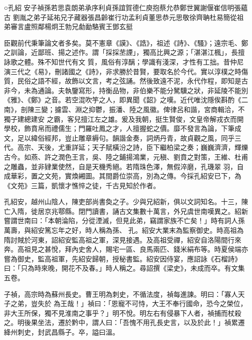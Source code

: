 
\begin{pinyinscope}

 ○孔紹
 安子禎孫若思袁朗弟承序利貞孫誼賀德仁庾抱蔡允恭鄭世翼謝偃崔信明張蘊古
 劉胤之弟子延祐兄子藏器張昌齡崔行功孟利貞董思恭元思敬徐齊聃杜易簡從祖弟審言盧照鄰楊炯王勃兄勮勔駱賓王鄧玄挺



 臣觀前代秉筆論文者多矣。莫不憲章《謨》、《誥》，祖述《詩》、《騷》；遠宗毛、鄭之訓論，近鄙班、揚之述作。謂「採採苤諲」，獨高比興之源；「湛湛江楓」，長擅詠歌之體。殊不知世代有文
 質，風俗有淳醨；學識有淺深，才性有工拙。昔仲尼演三代之《易》，刪諸國之《詩》，非求勝於昔賢，要取名於今代。實以淳樸之時傷質，民俗之語不經，故飾以文言，考之弦誦。然後致遠不泥，永代作程，即知是古非今，未為通論。夫執鑒寫形，持衡品物，非伯樂不能分駑驥之狀，非延陵不能別《雅》、《鄭》之音。若空混吹竽之人，即異聞《韶》之嘆。近代唯沈隱俟斟酌《二南》，剖陳三變；攄雲、淵之抑鬱，振潘、陸之風徽。俾律呂和諧，宮商輯洽，不獨子建總建安
 之霸，客兒擅江左之雄。爰及我朝，挺生賢俊，文皇帝解戎衣而開學校，飾賁帛而禮儒生；門羅吐鳳之才，人擅握蛇之價。靡不發言為論，下筆成文，足以緯俗經邦，豈止雕章縟句。韻諧金奏，詞炳丹青，故貞觀之風，同乎三代。高宗、天後，尤重詳延；天子賦橫汾之詩，臣下繼柏梁之奏；巍巍濟濟，輝爍古今。如燕、許之潤色王言，吳、陸之鋪揚鴻業，元稹、劉賁之對策，王維、杜甫之雕蟲，並非肄業使然，自是天機秀絕。若隋珠色澤，無假淬磨，孔璣翠
 羽，自成華彩，置之文苑，實煥緗圖。其間爵位崇高，別為之傳。今採孔紹安已下，為《文苑》三篇，凱懷才憔悴之徒，千古見知於作者。



 孔紹安，越州山陰人，陳吏部尚書奐之子。少與兄紹新，俱以文詞知名。十三，陳亡入隋，徙居京兆鄠縣。閉門讀書，誦古文集數十萬言，外兄虞世南嘆異之。紹新嘗謂世南曰：「本朝淪陷，分從湮滅，但見此弟，竊謂家族不亡矣！」時有詞人孫萬壽，與紹安篤忘年之好，時人稱為孫、
 孔。紹安大業末為監察御史。時高祖為隋討賊於河東，詔紹安監高祖之軍，深見接遇。及高祖受禪，紹安自洛陽間行來奔。高祖見之甚悅，拜內史舍人，賜宅一區、良馬兩匹、錢米絹布等。時夏侯端亦嘗為御史，監高祖軍，先紹安歸朝，授秘書監。紹安因侍宴，應詔詠《石榴詩》曰：「只為時來晚，開花不及春。」時人稱之。尋詔撰《梁史》，未成而卒。有文集五卷。



 子禎，高宗時為蘇州長史。曹王明為刺史，不循法度，禎每進諫。明曰：「寡人天子之弟，豈失於
 為王哉！」禎曰：「恩寵不可恃，大王不奉行國命，恐今之榮位，非大王所保，獨不見淮南之事乎？」明不悅。明左右有侵暴下人者，禎捕而杖殺之。明後果坐法，遷於黔中，謂人曰：「吾愧不用孔長史言，以及於此！」禎累遷絳州刺史，封武昌縣子。卒，謚曰溫。




\end{pinyinscope}
